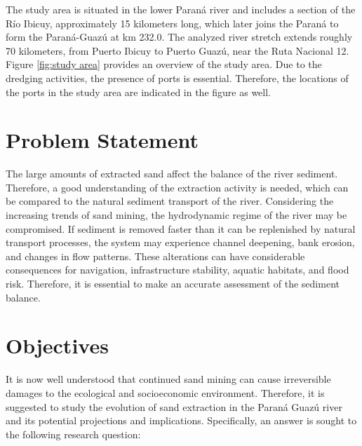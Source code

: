The study area is situated in the lower Paraná river and includes a section of the Río Ibicuy, approximately 15 kilometers long, which later joins the Paraná to form the Paraná-Guazú at km 232.0. The analyzed river stretch extends roughly 70 kilometers, from Puerto Ibicuy to Puerto Guazú, near the Ruta Nacional 12. Figure \ref{fig:study area} provides an overview of the study area. Due to the dredging activities, the presence of ports is essential. Therefore, the locations of the ports in the study area are indicated in the figure as well. 

\section{Problem Statement}
The large amounts of extracted sand affect the balance of the river sediment. Therefore, a good understanding of the extraction activity is needed, which can be compared to the natural sediment transport of the river. Considering the increasing trends of sand mining, the hydrodynamic regime of the river may be compromised. If sediment is removed faster than it can be replenished by natural transport processes, the system may experience channel deepening, bank erosion, and changes in flow patterns. These alterations can have considerable consequences for navigation, infrastructure stability, aquatic habitats, and flood risk. Therefore, it is essential to make an accurate assessment of the sediment balance.

\section{Objectives}


It is now well understood that continued sand mining can cause irreversible damages to the ecological and socioeconomic environment. Therefore, it is suggested to study the evolution of sand extraction in the Paraná Guazú river and its potential projections and implications. Specifically, an answer is sought to the following research question:

